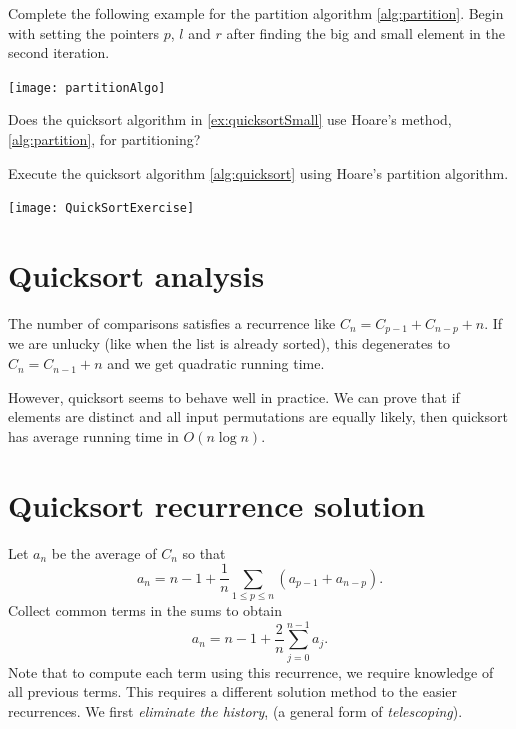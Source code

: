 \begin{Boxample}[0]
Complete the following example for the partition algorithm \cref{alg:partition}. 
Begin with setting the pointers $p$, $l$ and $r$ after finding the big and small element in the second iteration.
\begin{center}
\texttt{[image: partitionAlgo]}
\end{center}
\end{Boxample}

\begin{Boxample}[1]
Does the quicksort algorithm in \cref{ex:quicksortSmall} use Hoare's method, \cref{alg:partition}, for partitioning? 
\end{Boxample}


\begin{Boxample}[2]
Execute the quicksort algorithm \cref{alg:quicksort} using Hoare's partition algorithm.
\begin{center}
\texttt{[image: QuickSortExercise]}
\end{center}
\end{Boxample}

\section{Quicksort analysis}
The number of comparisons satisfies a recurrence like 
$C_n = C_{p-1} + C_{n - p} + n$. If we are unlucky (like when the list is already sorted), this degenerates to 
$C_{n} = C_{n-1} + n$ and we get quadratic running time.

However, quicksort seems to behave well in practice. We can prove that 
if elements are distinct and all input permutations are equally likely, then 
quicksort has average running time in $O(n \log n)$.


\section{Quicksort recurrence solution}
Let $a_n$ be the average of $C_n$ so that 
$$a_n = n - 1 + \frac{1}{n} \sum_{1\leq p \leq n} (a_{p-1} + a_{n-p}).$$
Collect common terms in the sums to obtain
$$a_n = n - 1 + \frac{2}{n} \sum_{j=0}^{n-1} a_j.$$ 
Note that to compute each term using this recurrence, we require knowledge of all previous terms.
This requires a different solution method to the easier recurrences.
We first \emph{eliminate the history}, (a general form of \emph{telescoping}). 

